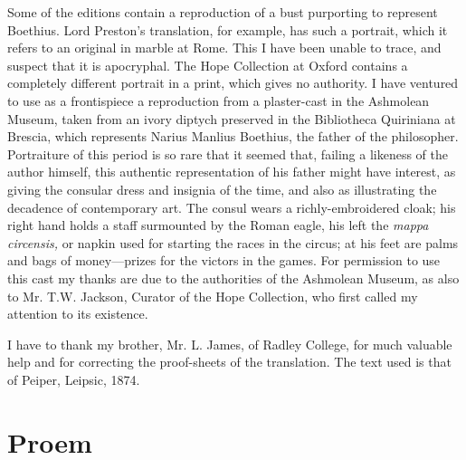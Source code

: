 \documentclass[11pt]{book}
\begin{document}
\label{diptych}
Some of the editions contain a reproduction of a bust purporting to
represent Boethius. Lord Preston's translation, for example, has such a
portrait, which it refers to an original in marble at Rome. This I have
been unable to trace, and suspect that it is apocryphal. The Hope
Collection at Oxford contains a completely different portrait in a
print, which gives no authority. I have ventured to use as a
frontispiece a reproduction from a plaster-cast in the Ashmolean Museum,
taken from an ivory diptych preserved in the Bibliotheca Quiriniana at
Brescia, which represents Narius Manlius Boethius, the father of the
philosopher. Portraiture of this period is so rare that it seemed that,
failing a likeness of the author himself, this authentic representation
of his father might have interest, as giving the consular dress and
insignia of the time, and also as illustrating the decadence of
contemporary art. The consul wears a richly-embroidered cloak; his right
hand holds a staff surmounted by the Roman eagle, his left the \emph{mappa
circensis,} or napkin used for starting the races in the circus; at his
feet are palms and bags of money---prizes for the victors in the games.
For permission to use this cast my thanks are due to the authorities of
the Ashmolean Museum, as also to Mr. T.W. Jackson, Curator of the Hope
Collection, who first called my attention to its existence.

I have to thank my brother, Mr. L. James, of Radley College, for much
valuable help and for correcting the proof-sheets of the translation.
The text used is that of Peiper, Leipsic, 1874.

\hspace{0pt}
\vfill


\chapter{Proem}
\end{document}
